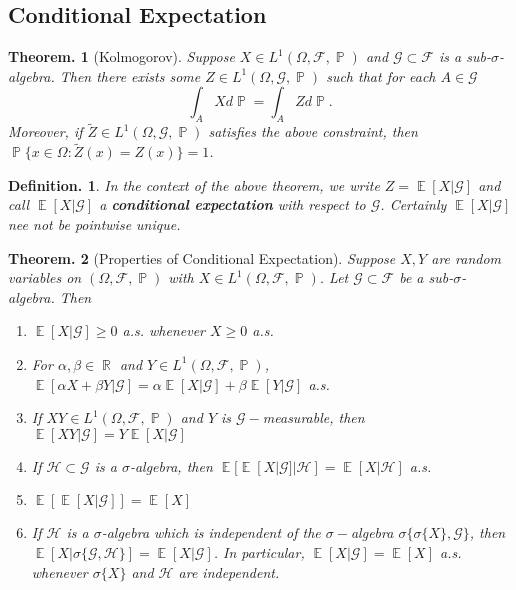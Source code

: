 \documentclass[11pt, a4paper]{memoir}
\DeclareMathOperator{\R}{{\mathbb{R}}}
\theoremstyle{change}
\newtheorem{theorem}{Theorem.}[section]
\theoremstyle{plain}
\theoremstyle{nonumberplain}
\newtheorem{definition}{Definition.}
\DeclareMathOperator{\pr}{{\mathbb{P}}}
\DeclareMathOperator{\E}{{\mathbb{E}}}
\newcommand{\defn}[1]{{\boldmath\bfseries #1}}
\numberwithin{equation}{section}
\begin{document}
\subsection{Conditional Expectation}
\begin{theorem}[Kolmogorov]
    Suppose $X\in L^1(\Omega,\mathcal{F},\pr)$ and $\mathcal{G}\subset\mathcal{F}$ is a sub-$\sigma$-algebra.
    Then there exists some $Z\in L^1(\Omega,\mathcal{G},\pr)$ such that for each $A\in\mathcal{G}$
    \begin{equation*}
        \int_A Xd\pr=\int_A Zd\pr.
    \end{equation*}
    Moreover, if $\tilde Z\in L^1(\Omega,\mathcal{G},\pr)$ satisfies the above constraint, then $\pr\{x\in\Omega:\tilde Z(x)=Z(x)\}=1$.
\end{theorem}
\begin{definition}
    In the context of the above theorem, we write $Z=\E[X|\mathcal{G}]$ and call $\E[X|\mathcal{G}]$ a \defn{conditional expectation} with respect to $\mathcal{G}$.
    Certainly $\E[X|\mathcal{G}]$ nee not be pointwise unique.
\end{definition}
\begin{theorem}[Properties of Conditional Expectation]
    Suppose $X,Y$ are random variables on $(\Omega,\mathcal{F},\pr)$ with $X\in L^1(\Omega,\mathcal{F},\pr)$.
    Let $\mathcal{G}\subset\mathcal{F}$ be a sub-$\sigma$-algebra.
    Then
    \begin{enumerate}[nl]
        \item $\E[X|\mathcal{G}]\geq 0$ a.s. whenever $X\geq 0$ a.s.
        \item For $\alpha,\beta\in\R$ and $Y\in L^1(\Omega,\mathcal{F},\pr)$, $\E[\alpha X+\beta Y|\mathcal{G}]=\alpha\E[X|\mathcal{G}]+\beta\E[Y|\mathcal{G}]$ a.s.
        \item If $XY\in L^1(\Omega,\mathcal{F},\pr)$ and $Y$ is $\mathcal{G}-$measurable, then $\E[XY|\mathcal{G}]=Y\E[X|\mathcal{G}]$
        \item If $\mathcal{H}\subset\mathcal{G}$ is a $\sigma$-algebra, then $\E[\E[X|\mathcal{G}]|\mathcal{H}]=\E[X|\mathcal{H}]$ a.s.
        \item $\E[\E[X|\mathcal{G}]]=\E[X]$
        \item If $\mathcal{H}$ is a $\sigma$-algebra which is independent of the $\sigma-$algebra $\sigma\{\sigma\{X\},\mathcal{G}\}$, then $\E[X|\sigma\{\mathcal{G},\mathcal{H}\}]=\E[X|\mathcal{G}]$.
            In particular, $\E[X|\mathcal{G}]=\E[X]$ a.s. whenever $\sigma\{X\}$ and $\mathcal{H}$ are independent.
    \end{enumerate}
\end{theorem}
\end{document}
